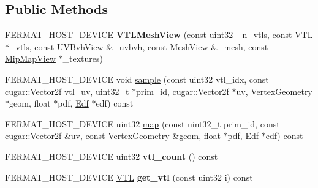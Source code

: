 \subsection*{Public Methods}
\begin{DoxyCompactItemize}
\item 
\mbox{\label{struct_v_t_l_mesh_view_a0a2a2b9bdc64659c1fb02b732e8fc71c}} 
F\+E\+R\+M\+A\+T\+\_\+\+H\+O\+S\+T\+\_\+\+D\+E\+V\+I\+CE {\bfseries V\+T\+L\+Mesh\+View} (const uint32 \+\_\+n\+\_\+vtls, const \hyperlink{struct_v_t_l}{V\+TL} $\ast$\+\_\+vtls, const \hyperlink{struct_u_v_bvh_view}{U\+V\+Bvh\+View} \&\+\_\+uvbvh, const \hyperlink{struct_mesh_view}{Mesh\+View} \&\+\_\+mesh, const \hyperlink{struct_mip_map_view}{Mip\+Map\+View} $\ast$\+\_\+textures)
\item 
F\+E\+R\+M\+A\+T\+\_\+\+H\+O\+S\+T\+\_\+\+D\+E\+V\+I\+CE void \hyperlink{struct_v_t_l_mesh_view_a2026bede1d2bf7ef4cfaad5d80882b69}{sample} (const uint32 vtl\+\_\+idx, const \hyperlink{structcugar_1_1_vector}{cugar\+::\+Vector2f} vtl\+\_\+uv, uint32\+\_\+t $\ast$prim\+\_\+id, \hyperlink{structcugar_1_1_vector}{cugar\+::\+Vector2f} $\ast$uv, \hyperlink{struct_vertex_geometry}{Vertex\+Geometry} $\ast$geom, float $\ast$pdf, \hyperlink{struct_edf}{Edf} $\ast$edf) const
\item 
F\+E\+R\+M\+A\+T\+\_\+\+H\+O\+S\+T\+\_\+\+D\+E\+V\+I\+CE uint32 \hyperlink{struct_v_t_l_mesh_view_a74c81f6a7fb7eca25c7f1a2584ec595d}{map} (const uint32\+\_\+t prim\+\_\+id, const \hyperlink{structcugar_1_1_vector}{cugar\+::\+Vector2f} \&uv, const \hyperlink{struct_vertex_geometry}{Vertex\+Geometry} \&geom, float $\ast$pdf, \hyperlink{struct_edf}{Edf} $\ast$edf) const
\item 
\mbox{\label{struct_v_t_l_mesh_view_a1781848c9bcf42f5fedc89b667183cd1}} 
F\+E\+R\+M\+A\+T\+\_\+\+H\+O\+S\+T\+\_\+\+D\+E\+V\+I\+CE uint32 {\bfseries vtl\+\_\+count} () const
\item 
\mbox{\label{struct_v_t_l_mesh_view_ac615562473fc2f006d733d1cfa3399a2}} 
F\+E\+R\+M\+A\+T\+\_\+\+H\+O\+S\+T\+\_\+\+D\+E\+V\+I\+CE \hyperlink{struct_v_t_l}{V\+TL} {\bfseries get\+\_\+vtl} (const uint32 i) const
\end{DoxyCompactItemize}
